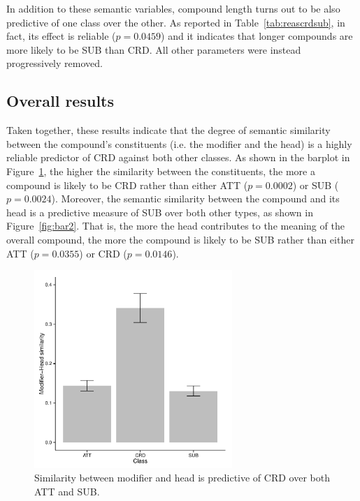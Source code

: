 \documentclass[output=paper]{langsci/langscibook}
\begin{document}
In addition to these semantic variables, compound length turns out to be also predictive of one class over the other. As reported in Table~\ref{tab:reascrdsub}, in fact, its effect is reliable ($p=0.0459$) and it indicates that longer compounds are more likely to be SUB than CRD. All other parameters were instead progressively removed.

\subsection{Overall results}

Taken together, these results indicate that the degree of semantic similarity between the compound's constituents (i.e. the modifier and the head) is a highly reliable predictor of CRD against both other classes. As shown in the barplot in Figure~\ref{fig:bar1}, the higher the similarity between the constituents, the more a compound is likely to be CRD rather than either ATT ($p=0.0002$) or SUB ($p=0.0024$). Moreover, the semantic similarity between the compound and its head is a predictive measure of SUB over both other types, as shown in Figure~\ref{fig:bar2}. That is, the more the head contributes to the meaning of the overall compound, the more the compound is likely to be SUB rather than either ATT ($p=0.0355$) or CRD ($p=0.0146$).

\begin{figure}[p]
\begin{center}
\includegraphics[width=7.5cm]{figures/barplot1.pdf}
\caption{Similarity between modifier and head is predictive of CRD over both ATT and SUB.}\label{fig:bar1}
\end{center}
\end{figure}
\end{document}
